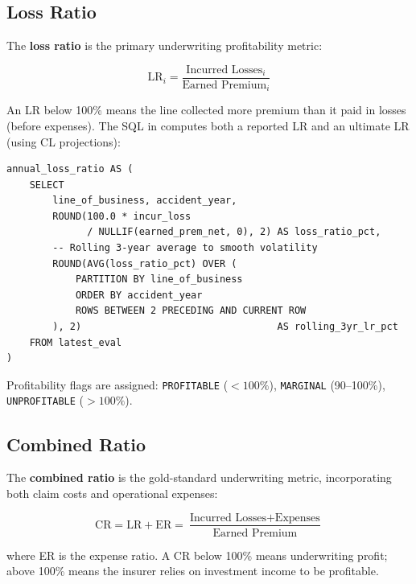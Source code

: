 \subsection{Loss Ratio}

The \textbf{loss ratio} is the primary underwriting profitability metric:

\begin{equation}
  \mathrm{LR}_i = \frac{\text{Incurred Losses}_i}{\text{Earned Premium}_i}
  \label{eq:loss-ratio}
\end{equation}

An LR below 100\% means the line collected more premium than it paid in
losses (before expenses).  The SQL in 
computes both a reported LR and an ultimate LR (using CL projections):

\begin{lstlisting}[style=sql, caption={Loss ratio computation (\texttt{02\_loss\_ratio\_by\_lob.sql})}]
annual_loss_ratio AS (
    SELECT
        line_of_business, accident_year,
        ROUND(100.0 * incur_loss
              / NULLIF(earned_prem_net, 0), 2) AS loss_ratio_pct,
        -- Rolling 3-year average to smooth volatility
        ROUND(AVG(loss_ratio_pct) OVER (
            PARTITION BY line_of_business
            ORDER BY accident_year
            ROWS BETWEEN 2 PRECEDING AND CURRENT ROW
        ), 2)                                  AS rolling_3yr_lr_pct
    FROM latest_eval
)
\end{lstlisting}

Profitability flags are assigned: \texttt{PROFITABLE} ($< 100\%$),
\texttt{MARGINAL} (90--100\%), \texttt{UNPROFITABLE} ($> 100\%$).

\subsection{Combined Ratio}

The \textbf{combined ratio} is the gold-standard underwriting metric,
incorporating both claim costs and operational expenses:

\begin{equation}
  \mathrm{CR} = \mathrm{LR} + \mathrm{ER}
  = \frac{\text{Incurred Losses} + \text{Expenses}}{\text{Earned Premium}}
  \label{eq:combined-ratio}
\end{equation}

where ER is the expense ratio.  A CR below 100\% means underwriting profit;
above 100\% means the insurer relies on investment income to be profitable.

